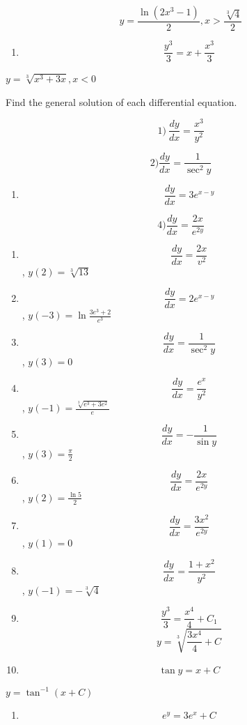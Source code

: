 \documentclass[
]{article}
\providecommand{\tightlist}{%
  \setlength{\itemsep}{0pt}\setlength{\parskip}{0pt}}
\begin{document}
\[y = \frac{\ln(2x^3 - 1)}{2}, x > \frac{\sqrt[3]{4}}{2}\]

\begin{enumerate}
\def\labelenumi{\arabic{enumi})}
\setcounter{enumi}{11}
\tightlist
\item
  \[\frac{y^3}{3} = x + \frac{x^3}{3}\]
\end{enumerate}

\(y = \sqrt[3]{x^3 + 3x}, x < 0\)

Find the general solution of each differential equation.

\[1) \ \frac{dy}{dx} = \frac{x^3}{y^2}\]

\[2) \frac{dy}{dx} = \frac{1}{\sec^2 y}\]

\begin{enumerate}
\def\labelenumi{\arabic{enumi})}
\setcounter{enumi}{2}
\tightlist
\item
  \[\frac{dy}{dx} = 3e^{x-y}\]
\end{enumerate}

\[4) \frac{dy}{dx} = \frac{2x}{e^{2y}}\]

\begin{enumerate}
\def\labelenumi{\arabic{enumi})}
\setcounter{enumi}{4}
\item
  \[\frac{dy}{dx} = \frac{2x}{v^2}\] , \(y(2) = \sqrt[3]{13}\)
\item
  \[\frac{dy}{dx} = 2e^{x-y}\] , \(y(-3) = \ln \frac{3e^3 + 2}{e^3}\)
\item
  \[\frac{dy}{dx} = \frac{1}{\sec^2 y}\] , \(y(3) = 0\)
\item
  \[\frac{dy}{dx} = \frac{e^x}{y^2}\] ,
  \(y(-1) = \frac{\sqrt[3]{e^3 + 3e^2}}{e}\)
\item
  \[\frac{dy}{dx} = -\frac{1}{\sin y}\] , \(y(3) = \frac{\pi}{2}\)
\item
  \[\frac{dy}{dx} = \frac{2x}{e^{2y}}\] , \(y(2) = \frac{\ln 5}{2}\)
\item
  \[\frac{dy}{dx} = \frac{3x^2}{e^{2y}}\] , \(y(1) = 0\)
\item
  \[\frac{dy}{dx} = \frac{1+x^2}{y^2}\] , \(y(-1) = -\sqrt[3]{4}\)
\item
  \[\frac{y^3}{3} = \frac{x^4}{4} + C_1\]
  \[y = \sqrt[3]{\frac{3x^4}{4} + C}\]
\item
  \[\tan y = x + C\]
\end{enumerate}

\(y = \tan^{-1} (x + C)\)

\begin{enumerate}
\def\labelenumi{\arabic{enumi})}
\setcounter{enumi}{2}
\tightlist
\item
  \[e^y = 3e^x + C\]
\end{enumerate}
\end{document}

